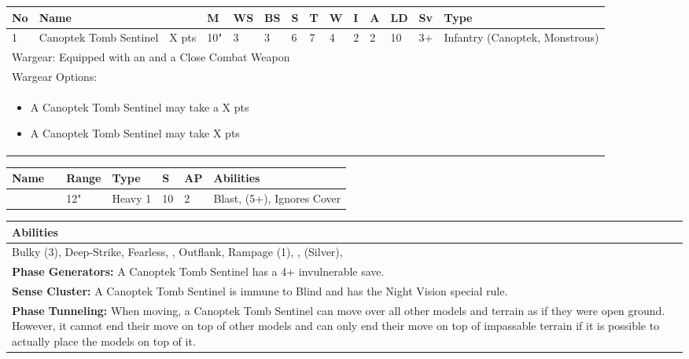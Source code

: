 \noindent
\begin{tabular}{||m{10pt} m{115pt} m{30pt} m{11pt} m{11pt} m{11pt} m{11pt} m{11pt} m{11pt} m{11pt} m{11pt} m{11pt} m{11pt} m{105pt}||}
	\hline
	No & Name & & M & WS & BS & S & T & W & I & A & LD & Sv & Type \\
	\hline
	1 & Canoptek Tomb Sentinel & X pts & 10" & 3 & 3 & 6 & 7 & 4 & 2 & 2 & 10 & 3+ & Infantry (Canoptek, Monstrous)\\
	\hline
	\hline
	\multicolumn{14}{||Z{532 pt}||}{Wargear: Equipped with an \quickref{Exile Cannon} and a Close Combat Weapon}\\
	\multicolumn{14}{||Z{532 pt}||}{Wargear Options:} \\	\multicolumn{14}{||Z{532 pt}||}{\begin{itemize}
			\item A Canoptek Tomb Sentinel may take a \quickref{Gloom Prism} \hrulefill X pts
			\item A Canoptek Tomb Sentinel may take \quickref{Sepulchral Scarabs} \hrulefill X pts
	\end{itemize}} \\
	\hline
\end{tabular}

\noindent
\begin{tabular}{||m{110pt} m{30pt} m{31pt} m{55pt} m{12pt} m{12pt} m{210pt}||}
	\hline
	Name & & Range & Type & S & AP & Abilities \\
	\hline
	\quickref{Exile Cannon} & & 12" & Heavy 1 & 10 & 2 & Blast, \quickref{Exile Ray} (5+), Ignores Cover \\
	\hline
\end{tabular}

\noindent
\begin{tabular}{||m{532pt}||}
	\hline
	Abilities \\
	\hline
	Bulky (3), Deep-Strike, Fearless, \quickref{Living Metal}, Outflank, Rampage (1), \quickref{Reanimation Protocols}, \quickref{Soulless Hordes} (Silver), \quickref{Tomb Guardians} \\
	\textbf{Phase Generators:} A Canoptek Tomb Sentinel has a 4+ invulnerable save. \\
	\textbf{Sense Cluster:} A Canoptek Tomb Sentinel is immune to Blind and has the Night Vision special rule. \\
	\textbf{Phase Tunneling:} When moving, a Canoptek Tomb Sentinel can move over all other models and terrain as if they were open ground. However, it cannot end their move on top of other models and can only end their move on top of impassable terrain if it is possible to actually place the models on top of it. \\
	\hline
\end{tabular}



